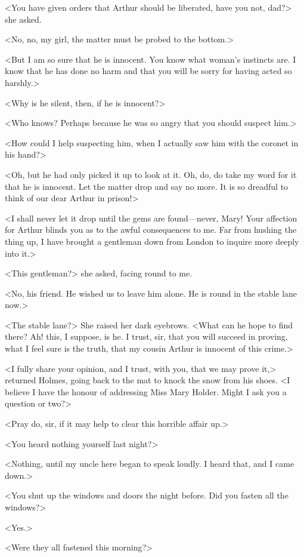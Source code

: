<You have given orders that Arthur should be liberated, have you not, dad?> she asked.

<No, no, my girl, the matter must be probed to the bottom.>

<But I am so sure that he is innocent. You know what woman's instincts are. I know that he has done no harm and that you will be sorry for having acted so harshly.>

<Why is he silent, then, if he is innocent?>

<Who knows? Perhaps because he was so angry that you should suspect him.>

<How could I help suspecting him, when I actually saw him with the coronet in his hand?>

<Oh, but he had only picked it up to look at it. Oh, do, do take my word for it that he is innocent. Let the matter drop and say no more. It is so dreadful to think of our dear Arthur in prison!>

<I shall never let it drop until the gems are found—never, Mary! Your affection for Arthur blinds you as to the awful consequences to me. Far from hushing the thing up, I have brought a gentleman down from London to inquire more deeply into it.>

<This gentleman?> she asked, facing round to me.

<No, his friend. He wished us to leave him alone. He is round in the stable lane now.>

<The stable lane?> She raised her dark eyebrows. <What can he hope to find there? Ah! this, I suppose, is he. I trust, sir, that you will succeed in proving, what I feel sure is the truth, that my cousin Arthur is innocent of this crime.>

<I fully share your opinion, and I trust, with you, that we may prove it,> returned Holmes, going back to the mat to knock the snow from his shoes. <I believe I have the honour of addressing Miss Mary Holder. Might I ask you a question or two?>

<Pray do, sir, if it may help to clear this horrible affair up.>

<You heard nothing yourself last night?>

<Nothing, until my uncle here began to speak loudly. I heard that, and I came down.>

<You shut up the windows and doors the night before. Did you fasten all the windows?>

<Yes.>

<Were they all fastened this morning?>

